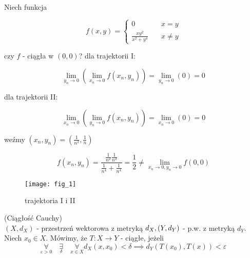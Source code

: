 \documentclass[../main.tex]{subfiles}
\begin{document}
\begin{przyklad}
    Niech funkcja

\[ f(x,y) =
\begin{cases}
    0                           & \quad x=y\\
    \frac{xy^2}{x^2+y^4}  & \quad x\neq y
\end{cases}
\]

czy $f$ - ciągła w $(0,0)$?
dla trajektorii I:

$$\lim\limits_{y_{n}\to 0}(\lim\limits_{x_{n}\rightarrow 0} f(x_{n},y_{n})) = \lim\limits_{y_{n}\rightarrow 0}(0) = 0$$

dla trajektorii II:

$$\lim\limits_{x_{n}\to 0}(\lim\limits_{y_{n}\rightarrow 0} f(x_{n},y_{n})) = \lim\limits_{x_{n}\rightarrow 0}(0) = 0$$

weźmy $(x_{n},y_{n}) = (\frac{1}{n^{2}},\frac{1}{n})$

$$f(x_{n},y_{n}) = \frac{\frac{1}{n^{2}} \frac{1}{n^{2}}}{\frac{1}{n^{4}}+\frac{1}{n^{4}}} = \frac{1}{2} \neq \lim\limits_{x_{n}\to 0, y_{n}\to 0} f(0,0)$$
\end{przyklad}

\begin{figure}
    \centering
    \begin{center}
        \texttt{[image: fig\_1]}
    \end{center}
    \caption{trajektoria I i II}
\end{figure}


\begin{definicja}
    (Ciągłość Cauchy)\\
$(X,d_{X})$ - przestrzeń wektorowa z metryką $d_{X},\\ (Y,d_{Y})$ - p.w. z metryką $d_{Y}$.\\
Niech $x_{0}\in X$. Mówimy, że $T: X\to Y$ - ciągłe, jeżeli
$$\underset{\varepsilon > 0}{\forall} \quad\underset{\delta}{\exists} \quad\underset{x\in X}{\forall} d_{X} (x,x_{0}) < \delta \implies d_{Y} (T(x_{0}), T(x)) < \varepsilon$$
\end{definicja}
\end{document}

